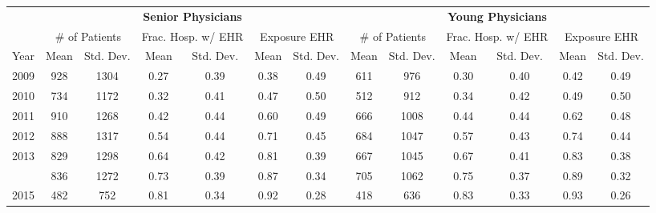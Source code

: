 
\scriptsize
\begin{tabular}[t]{lcccccccccccc}
\toprule
\multicolumn{1}{c}{ } & \multicolumn{6}{c}{\textbf{Senior Physicians}} & \multicolumn{6}{c}{\textbf{Young Physicians}} \\
\cmidrule(l{3pt}r{3pt}){2-7} \cmidrule(l{3pt}r{3pt}){8-13}
\multicolumn{1}{c}{ } & \multicolumn{2}{c}{\# of Patients} & \multicolumn{2}{c}{Frac. Hosp. w/ EHR} & \multicolumn{2}{c}{Exposure EHR} & \multicolumn{2}{c}{\# of Patients} & \multicolumn{2}{c}{Frac. Hosp. w/ EHR} & \multicolumn{2}{c}{Exposure EHR} \\
\cmidrule(l{3pt}r{3pt}){2-3} \cmidrule(l{3pt}r{3pt}){4-5} \cmidrule(l{3pt}r{3pt}){6-7} \cmidrule(l{3pt}r{3pt}){8-9} \cmidrule(l{3pt}r{3pt}){10-11} \cmidrule(l{3pt}r{3pt}){12-13}
Year & Mean & Std. Dev. & Mean & Std. Dev. & Mean & Std. Dev. & Mean & Std. Dev. & Mean & Std. Dev. & Mean & Std. Dev.\\
\midrule
2009 & 928 & 1304 & 0.27 & 0.39 & 0.38 & 0.49 & 611 & 976 & 0.30 & 0.40 & 0.42 & 0.49\\
2010 & 734 & 1172 & 0.32 & 0.41 & 0.47 & 0.50 & 512 & 912 & 0.34 & 0.42 & 0.49 & 0.50\\
2011 & 910 & 1268 & 0.42 & 0.44 & 0.60 & 0.49 & 666 & 1008 & 0.44 & 0.44 & 0.62 & 0.48\\
2012 & 888 & 1317 & 0.54 & 0.44 & 0.71 & 0.45 & 684 & 1047 & 0.57 & 0.43 & 0.74 & 0.44\\
2013 & 829 & 1298 & 0.64 & 0.42 & 0.81 & 0.39 & 667 & 1045 & 0.67 & 0.41 & 0.83 & 0.38\\
\addlinespace
2014 & 836 & 1272 & 0.73 & 0.39 & 0.87 & 0.34 & 705 & 1062 & 0.75 & 0.37 & 0.89 & 0.32\\
2015 & 482 & 752 & 0.81 & 0.34 & 0.92 & 0.28 & 418 & 636 & 0.83 & 0.33 & 0.93 & 0.26\\
\bottomrule
\end{tabular}
